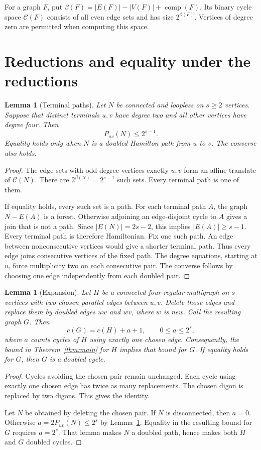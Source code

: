 \documentclass[11pt]{article}
\newtheorem{lemma}[theorem]{Lemma}
\newcommand{\Cyc}{\mathcal C}
\DeclareMathOperator{\comp}{comp}
\begin{document}
For a graph $F$, put $\beta(F)=|E(F)|-|V(F)|+\comp(F)$.
Its binary cycle space $\Cyc(F)$ consists of all even edge sets and has size $2^{\beta(F)}$.
Vertices of degree zero are permitted when computing this space.

\section{Reductions and equality under the reductions}

\begin{lemma}[Terminal paths]\label{lem:paths}
Let $N$ be connected and loopless on $s\ge2$ vertices.
Suppose that distinct terminals $u,v$ have degree two and all other vertices have degree four.
Then
\[
 P_{uv}(N)\le2^{s-1}.
\]
Equality holds only when $N$ is a doubled Hamilton path from $u$ to $v$.
The converse also holds.
\end{lemma}

\begin{proof}
The edge sets with odd-degree vertices exactly $u,v$ form an affine translate of $\Cyc(N)$.
There are $2^{\beta(N)}=2^{s-1}$ such sets.
Every terminal path is one of them.

If equality holds, every such set is a path.
For each terminal path $A$, the graph $N-E(A)$ is a forest.
Otherwise adjoining an edge-disjoint cycle to $A$ gives a join that is not a path.
Since $|E(N)|=2s-2$, this implies $|E(A)|\ge s-1$.
Every terminal path is therefore Hamiltonian.
Fix one such path.
An edge between nonconsecutive vertices would give a shorter terminal path.
Thus every edge joins consecutive vertices of the fixed path.
The degree equations, starting at $u$, force multiplicity two on each consecutive pair.
The converse follows by choosing one edge independently from each doubled pair.
\end{proof}

\begin{lemma}[Expansion]\label{lem:expansion}
Let $H$ be a connected four-regular multigraph on $s$ vertices with two chosen parallel edges between $u,v$.
Delete those edges and replace them by doubled edges $uw$ and $wv$, where $w$ is new.
Call the resulting graph $G$.
Then
\[
 c(G)=c(H)+a+1,\qquad 0\le a\le2^s,
\]
where $a$ counts cycles of $H$ using exactly one chosen edge.
Consequently, the bound in Theorem~\ref{thm:main} for $H$ implies that bound for $G$.
If equality holds for $G$, then $G$ is a doubled cycle.
\end{lemma}

\begin{proof}
Cycles avoiding the chosen pair remain unchanged.
Each cycle using exactly one chosen edge has twice as many replacements.
The chosen digon is replaced by two digons.
This gives the identity.

Let $N$ be obtained by deleting the chosen pair.
If $N$ is disconnected, then $a=0$.
Otherwise $a=2P_{uv}(N)\le2^s$ by Lemma~\ref{lem:paths}.
Equality in the resulting bound for $G$ requires $a=2^s$.
That lemma makes $N$ a doubled path, hence makes both $H$ and $G$ doubled cycles.
\end{proof}
\end{document}
